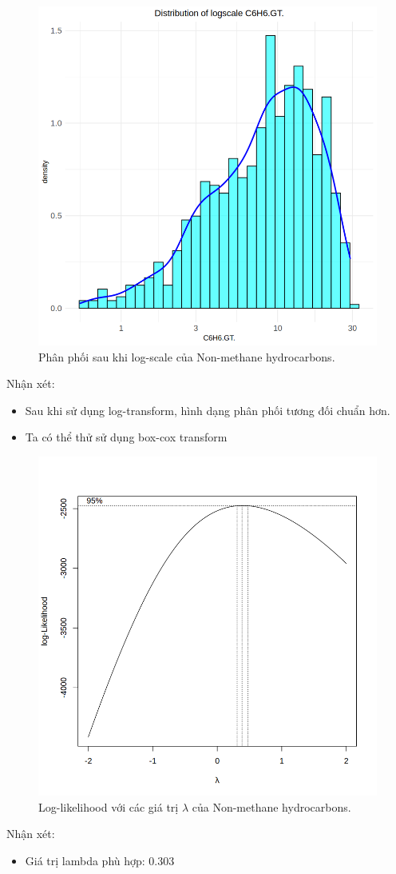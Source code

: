 \begin{figure}[H]
    \centering
    \includegraphics[width=0.75\columnwidth]{air_figures/C6H6(GT)_logscale_distribution.png}
    \caption{Phân phối sau khi log-scale của Non-methane hydrocarbons.}
    \label{fig:benzene_logscale_distribution}
\end{figure}
Nhận xét:
\begin{itemize}
    \item Sau khi sử dụng log-transform, hình dạng phân phối tương đối chuẩn hơn.
    \item Ta có thể thử sử dụng box-cox transform
\end{itemize}

\begin{figure}[H]
    \centering
    \includegraphics[width=0.75\columnwidth]{air_figures/C6H6(GT)_optimal_lambda.png}
    \caption{Log-likelihood với các giá trị $\lambda$ của Non-methane hydrocarbons.}
    \label{fig:benzene_optimal_lambda}
\end{figure}
Nhận xét:
\begin{itemize}
    \item Giá trị lambda phù hợp: 0.303
\end{itemize}


